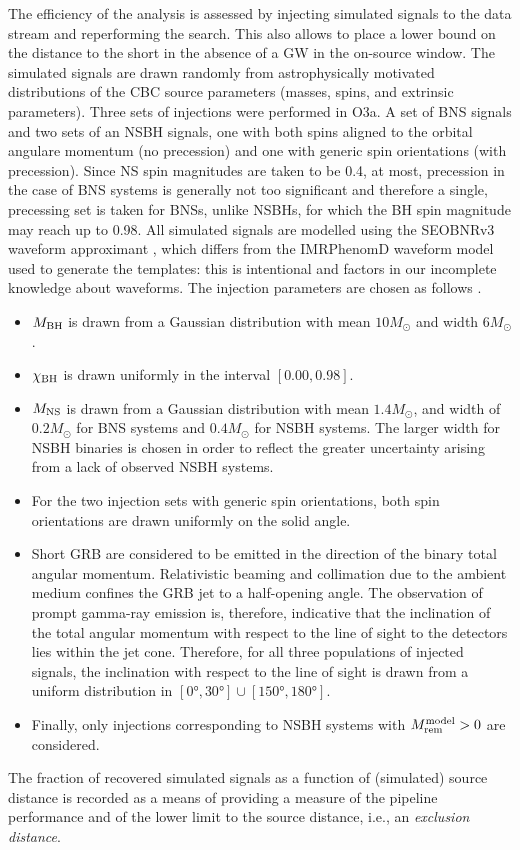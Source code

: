 \documentclass[binding=0.6cm, LaM]{sapthesis}
\begin{document}
        The efficiency of the analysis is assessed by injecting simulated signals to the data stream and reperforming the search.
 	This also allows to place a lower bound on the distance to the short in the absence of a GW in the on-source window. 
        The simulated signals are drawn randomly from astrophysically motivated distributions of the CBC source parameters (masses, spins, and extrinsic parameters).
	Three sets of injections were performed in O3a.  A set of BNS signals and two sets of an NSBH signals, one with both spins aligned to the orbital angulare momentum (no precession) and one with generic spin orientations (with precession).  Since NS spin magnitudes are taken to be 0.4, at most, precession in the case of BNS systems is generally not too significant and therefore a single, precessing set is taken for BNSs, unlike NSBHs, for which the BH spin magnitude may reach up to 0.98.
	All simulated signals are modelled using the {\ttfamily SEOBNRv3} waveform approximant \cite{103,173,174}, which differs from the {\ttfamily IMRPhenomD} waveform model used to generate the templates: this is intentional and factors in our incomplete knowledge about waveforms.
	The injection parameters are chosen as follows \cite{43}.
        \begin{itemize}
        \item $M_{\rm BH}$ is drawn from a Gaussian distribution with mean $10M_\odot$ and width $6M_\odot$.
        \item $\chi_{\rm BH}$ is drawn uniformly in the interval $[0.00, 0.98]$.
        \item $M_{\rm NS}$ is drawn from a Gaussian distribution with mean $1.4M_\odot$, and width of $0.2M_\odot$ for BNS systems and $0.4M_\odot$ for NSBH systems.
          The larger width for NSBH binaries is chosen in order to reflect the greater uncertainty arising from a lack of observed NSBH systems. 
        \item For the two injection sets with generic spin orientations, both spin orientations are drawn uniformly on the solid angle. 
        \item Short GRB are considered to be emitted in the direction of the binary total angular momentum.
          Relativistic beaming and collimation due to the ambient medium confines the GRB jet to a half-opening angle. 
          The observation of prompt gamma-ray emission is, therefore, indicative that the inclination of the total angular momentum 
          with respect to the line of sight to the detectors lies within the jet cone.
          Therefore, for all three populations of injected signals,
          the inclination with respect to the line of sight is drawn from a uniform distribution in $[\ang{0}, \ang{30}] \cup [\ang{150}, \ang{180}]$.
        \item Finally, only injections corresponding to NSBH systems with $M_{\rm rem}^{\rm model}>0$ are considered.
        \end{itemize}
        The fraction of recovered simulated signals as a function of (simulated) source distance is recorded as a means of providing a measure of the pipeline performance 
	and of the lower limit to the source distance, i.e., an \emph{exclusion distance}.
\end{document}
